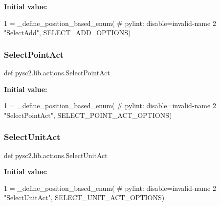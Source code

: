 {\bfseries Initial value\+:}
\begin{DoxyCode}
1 =  \_define\_position\_based\_enum(  \textcolor{comment}{# pylint: disable=invalid-name}
2     \textcolor{stringliteral}{"SelectAdd"}, SELECT\_ADD\_OPTIONS)
\end{DoxyCode}
\mbox{\label{namespacepysc2_1_1lib_1_1actions_ae29abc92bb08d061b049a01106cb855c}} 
\subsubsection{\texorpdfstring{Select\+Point\+Act}{SelectPointAct}}
{\footnotesize\ttfamily def pysc2.\+lib.\+actions.\+Select\+Point\+Act}

{\bfseries Initial value\+:}
\begin{DoxyCode}
1 =  \_define\_position\_based\_enum(  \textcolor{comment}{# pylint: disable=invalid-name}
2     \textcolor{stringliteral}{"SelectPointAct"}, SELECT\_POINT\_ACT\_OPTIONS)
\end{DoxyCode}
\mbox{\label{namespacepysc2_1_1lib_1_1actions_a462c6eeb45f37a62f45b91117847af45}} 
\subsubsection{\texorpdfstring{Select\+Unit\+Act}{SelectUnitAct}}
{\footnotesize\ttfamily def pysc2.\+lib.\+actions.\+Select\+Unit\+Act}

{\bfseries Initial value\+:}
\begin{DoxyCode}
1 =  \_define\_position\_based\_enum(  \textcolor{comment}{# pylint: disable=invalid-name}
2     \textcolor{stringliteral}{"SelectUnitAct"}, SELECT\_UNIT\_ACT\_OPTIONS)
\end{DoxyCode}
\mbox{\label{namespacepysc2_1_1lib_1_1actions_a441d65909977d8b5c6cb4175239ad544}} 
